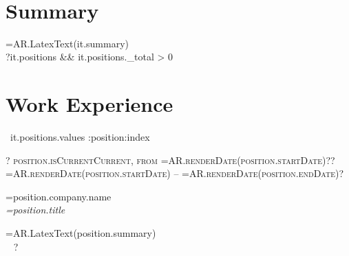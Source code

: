 \documentclass[10pt]{article} %
\begin{document}
\color{text1} %


\par{\\ %
\vspace{20pt}
	

\begin{minipage}[t]{0.5\textwidth} %
\vspace{0pt} %
	

\section{Summary} 
\normalsize{ {{=AR.LatexText(it.summary)}} }\\


{{?it.positions && it.positions._total > 0}}
\section{Work Experience} 

{{~it.positions.values :position:index}}
{\raggedleft\textsc{ {{? position.isCurrent}}Current, from {{=AR.renderDate(position.startDate)}}{{??}}{{=AR.renderDate(position.startDate)}} -- {{=AR.renderDate(position.endDate)}}{{?}} }\par}

{\raggedright\large {{=position.company.name}} \\
\textit{ {{=position.title}} }\\[5pt]}

\normalsize{ {{=AR.LatexText(position.summary)}} }\\
{{~}}
{{?}}


\end{minipage} %
\hfill
\begin{minipage}[t]{0.44\textwidth} %
\vspace{0pt} %


\end{minipage}}
\end{document}
